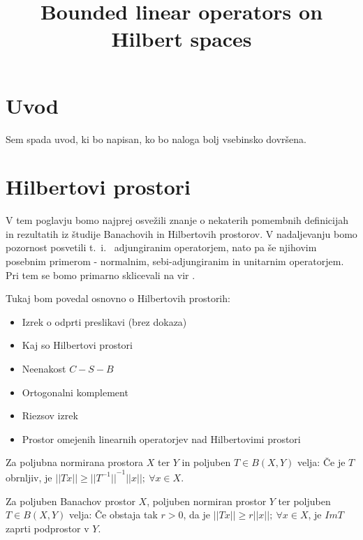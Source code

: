 \documentclass[mat2]{matdelo}
\title{Bounded linear operators on Hilbert spaces}
\newcommand{\abs}[1]{\ensuremath{\lvert #1 \rvert}}
\newcommand{\norm}[1]{\abs{\abs{#1}}}
\begin{document}
	
	\tableofcontents
	
	\section{Uvod}\label{sect:intro}
	Sem spada uvod, ki bo napisan, ko bo naloga bolj vsebinsko dovršena.
	
	\section{Hilbertovi prostori}
	V tem poglavju bomo najprej osvežili znanje o nekaterih pomembnih definicijah in rezultatih iz študije Banachovih in Hilbertovih prostorov. V nadaljevanju bomo pozornost posvetili t.~i.~ adjungiranim operatorjem, nato pa še njihovim posebnim primerom - normalnim, sebi-adjungiranim in unitarnim operatorjem. Pri tem se bomo primarno sklicevali na vir \cite{bib:Rynne}.
	
		Tukaj bom povedal osnovno o Hilbertovih prostorih: \begin{itemize}
			\item Izrek o odprti preslikavi (brez dokaza)
			\item Kaj so Hilbertovi prostori
			\item Neenakost $C-S-B$
			\item Ortogonalni komplement
			\item Riezsov izrek
			\item Prostor omejenih linearnih operatorjev nad Hilbertovimi prostori
		\end{itemize}
		
		\begin{lema}
			\label{lem:invnorm}
			Za poljubna normirana prostora $X$ ter $Y$ in poljuben $T\in B(X, Y)$ velja: Če je $T$ obrnljiv, je $\norm{Tx}\geq \norm{T^{-1}}^{-1}\norm{x};~\forall x\in X$.
		\end{lema}
		
		\begin{lema}
			\label{lem:banzap}
			Za poljuben Banachov prostor $X$, poljuben normiran prostor $Y$ ter poljuben $T\in B(X, Y)$ velja: Če obstaja tak $r>0$, da je $\norm{Tx}\geq r\norm{x};~\forall x\in X$, je $ImT$ zaprti podprostor v $Y$.
		\end{lema}
		
\end{document}
